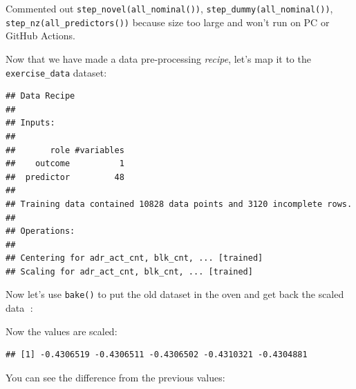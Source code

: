 \documentclass[
]{book}
\newenvironment{Shaded}{\begin{snugshade}}{\end{snugshade}}
\newcommand{\DecValTok}[1]{\textcolor[rgb]{0.00,0.00,0.81}{#1}}
\newcommand{\KeywordTok}[1]{\textcolor[rgb]{0.13,0.29,0.53}{\textbf{#1}}}
\newcommand{\NormalTok}[1]{#1}
\newcommand{\OperatorTok}[1]{\textcolor[rgb]{0.81,0.36,0.00}{\textbf{#1}}}
\newcommand{\StringTok}[1]{\textcolor[rgb]{0.31,0.60,0.02}{#1}}
\begin{document}
Commented out \texttt{step\_novel(all\_nominal())}, \texttt{step\_dummy(all\_nominal())}, \texttt{step\_nz(all\_predictors())} because size too large and won't run on PC or GitHub Actions.

Now that we have made a data pre-processing \emph{recipe}, let's map it to the \texttt{exercise\_data} dataset:

\begin{Shaded}
\end{Shaded}

\begin{verbatim}
## Data Recipe
## 
## Inputs:
## 
##       role #variables
##    outcome          1
##  predictor         48
## 
## Training data contained 10828 data points and 3120 incomplete rows. 
## 
## Operations:
## 
## Centering for adr_act_cnt, blk_cnt, ... [trained]
## Scaling for adr_act_cnt, blk_cnt, ... [trained]
\end{verbatim}

Now let's use \texttt{bake()} to put the old dataset in the oven and get back the scaled data 🍰:

\begin{Shaded}
\end{Shaded}

Now the values are scaled:

\begin{Shaded}
\end{Shaded}

\begin{verbatim}
## [1] -0.4306519 -0.4306511 -0.4306502 -0.4310321 -0.4304881
\end{verbatim}

You can see the difference from the previous values:
\end{document}
